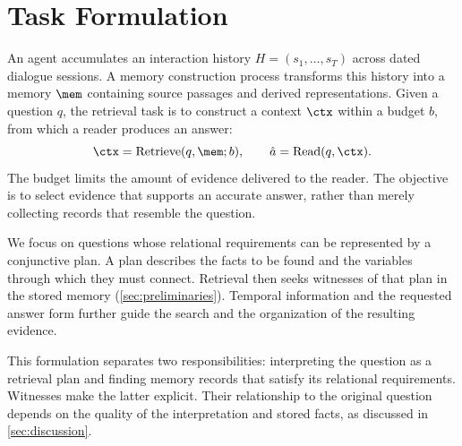 \section{Task Formulation}
\label{sec:problem}

An agent accumulates an interaction history $H=(s_1,\ldots,s_T)$ across
dated dialogue sessions. A memory construction process transforms this
history into a memory $\mem$ containing source passages and derived
representations. Given a question $q$, the retrieval task is to construct
a context $\ctx$ within a budget $b$, from which a reader produces an
answer:
\begin{equation}
 \ctx=\mathrm{Retrieve}(q,\mem;b),\qquad
 \hat a=\mathrm{Read}(q,\ctx).
 \label{eq:task}
\end{equation}
The budget limits the amount of evidence delivered to the reader.
The objective is to select evidence that supports an accurate answer,
rather than merely collecting records that resemble the question.

We focus on questions whose relational requirements can be represented
by a conjunctive plan. A plan describes the facts to be found and the
variables through which they must connect. Retrieval then seeks
witnesses of that plan in the stored memory
(\cref{sec:preliminaries}). Temporal information and the requested answer
form further guide the search and the organization of the resulting
evidence.

This formulation separates two responsibilities: interpreting the
question as a retrieval plan and finding memory records that satisfy
its relational requirements. Witnesses make the latter explicit.
Their relationship to the original question depends on the quality
of the interpretation and stored facts, as discussed in
\cref{sec:discussion}.
